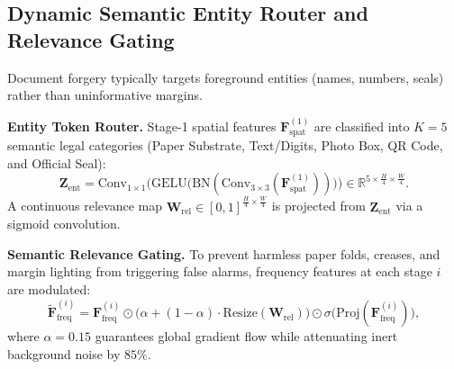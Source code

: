\documentclass[10pt,twocolumn,letterpaper]{article}
\begin{document}
\subsection{Dynamic Semantic Entity Router and Relevance Gating}
\label{subsec:entity_router}

Document forgery typically targets foreground entities (names, numbers, seals) rather than uninformative margins.

\noindent\textbf{Entity Token Router.}
Stage-1 spatial features $\mathbf{F}_{\text{spat}}^{(1)}$ are classified into $K=5$ semantic legal categories (Paper Substrate, Text/Digits, Photo Box, QR Code, and Official Seal):
\begin{equation}
    \mathbf{Z}_{\text{ent}} = \text{Conv}_{1 \times 1}\Big(\text{GELU}\big(\text{BN}(\text{Conv}_{3 \times 3}(\mathbf{F}_{\text{spat}}^{(1)}))\big)\Big) \in \mathbb{R}^{5 \times \frac{H}{4} \times \frac{W}{4}}.
\end{equation}
A continuous relevance map $\mathbf{W}_{\text{rel}} \in [0, 1]^{\frac{H}{4} \times \frac{W}{4}}$ is projected from $\mathbf{Z}_{\text{ent}}$ via a sigmoid convolution.

\noindent\textbf{Semantic Relevance Gating.}
To prevent harmless paper folds, creases, and margin lighting from triggering false alarms, frequency features at each stage $i$ are modulated:
\begin{equation}
    \tilde{\mathbf{F}}_{\text{freq}}^{(i)} = \mathbf{F}_{\text{freq}}^{(i)} \odot \Big(\alpha + (1 - \alpha) \cdot \text{Resize}(\mathbf{W}_{\text{rel}})\Big) \odot \sigma\Big(\text{Proj}(\mathbf{F}_{\text{freq}}^{(i)})\Big),
\end{equation}
where $\alpha = 0.15$ guarantees global gradient flow while attenuating inert background noise by $85\%$.
\end{document}

